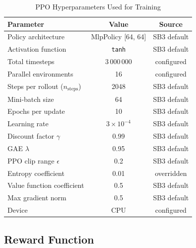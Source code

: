 \begin{table}[!t]
\centering
\renewcommand{\arraystretch}{1.15}
\caption{PPO Hyperparameters Used for Training}
\label{tab:ppo_hyperparams}
\begin{tabular}{lcc}
\toprule
\textbf{Parameter} & \textbf{Value} & \textbf{Source} \\
\midrule
Policy architecture                   & MlpPolicy {[}64, 64{]} & SB3 default \\
Activation function                   & \texttt{tanh}          & SB3 default \\
Total timesteps                       & 3\,000\,000            & configured  \\
Parallel environments                 & 16                     & configured  \\
Steps per rollout ($n_\text{steps}$)  & 2048                   & SB3 default \\
Mini-batch size                       & 64                     & SB3 default \\
Epochs per update                     & 10                     & SB3 default \\
Learning rate                         & $3\times10^{-4}$       & SB3 default \\
Discount factor $\gamma$              & 0.99                   & SB3 default \\
GAE $\lambda$~\cite{schulman2016gae}                         & 0.95                   & SB3 default \\
PPO clip range $\epsilon$             & 0.2                    & SB3 default \\
Entropy coefficient                   & 0.01                   & overridden  \\
Value function coefficient            & 0.5                    & SB3 default \\
Max gradient norm                     & 0.5                    & SB3 default \\
Device                                & CPU                    & configured  \\
\bottomrule
\end{tabular}
\end{table}

\subsection{Reward Function}
\label{appendix:reward_function}

